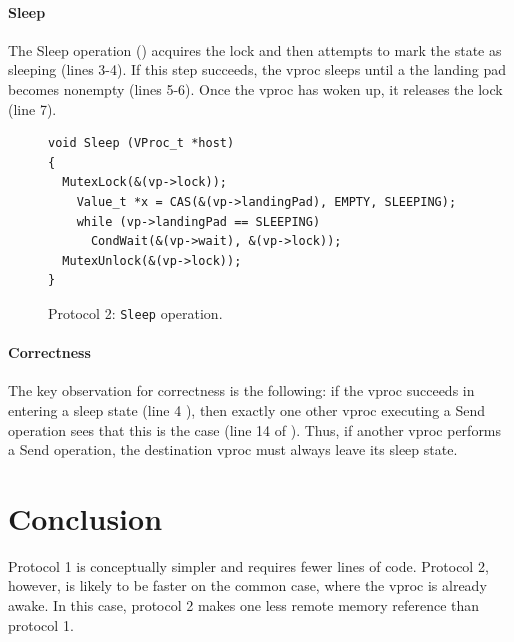 \documentclass[11pt]{article}
\begin{document}
\paragraph{Sleep}
The Sleep operation () acquires the lock
and then attempts to mark the state as sleeping (lines 3-4).
If this step succeeds, the vproc sleeps until a the landing pad becomes
nonempty (lines 5-6).
Once the vproc has woken up, it releases the lock (line 7).

\begin{figure}
\lstset{language=C}
\lstset{commentstyle=\textit}
\lstset{numbers=left}
\begin{lstlisting}
void Sleep (VProc_t *host)
{
  MutexLock(&(vp->lock));
    Value_t *x = CAS(&(vp->landingPad), EMPTY, SLEEPING);
    while (vp->landingPad == SLEEPING)
      CondWait(&(vp->wait), &(vp->lock));
  MutexUnlock(&(vp->lock));
}
\end{lstlisting}
\caption{Protocol 2: \texttt{Sleep} operation.}\label{fig:protocol2-sleep}
\end{figure}

\paragraph{Correctness}
The key observation for correctness is the following: if the vproc succeeds in 
entering a sleep state (line 4 ), then exactly one other vproc executing a Send operation sees 
that this is the case (line 14 of ).
Thus, if another vproc performs a Send operation, the destination vproc must always
leave its sleep state.

\section{Conclusion}\label{sec:conclusion}
Protocol 1 is conceptually simpler and requires fewer lines of code.
Protocol 2, however, is likely to be faster on the common case, where the vproc is
already awake.
In this case, protocol 2 makes one less remote memory reference than protocol 1.
\end{document}
